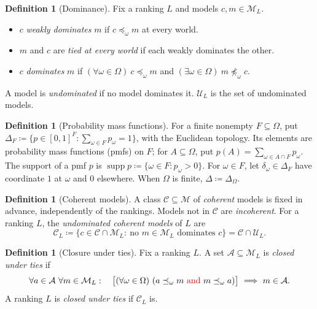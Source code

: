 \documentclass[11pt]{article}
\theoremstyle{definition}
\newtheorem{definition}[theorem]{Definition}
\theoremstyle{remark}
\newcommand{\M}{\mathcal M}
\newcommand{\C}{\mathcal C}
\newcommand{\U}{\mathcal U}
\newcommand{\supp}{\operatorname{supp}}
\begin{document}
\begin{definition}[Dominance]\label{def:dominance}
Fix a ranking $L$ and models $c,m\in\M_L$.
\begin{itemize}[leftmargin=*]
\item $c$ \emph{weakly dominates} $m$ if $c\preceq_\omega m$ at every world.
\item $m$ and $c$ are \emph{tied at every world} if each weakly dominates the other.
\item $c$ \emph{dominates} $m$ if $(\forall\omega\in\Omega)\ c\preceq_\omega m$ and $(\exists\omega\in\Omega)\ m\not\preceq_\omega c$.
\end{itemize}
A model is \emph{undominated} if no model dominates it. $\U_L$ is the set of undominated models.
\end{definition}

\begin{definition}[Probability mass functions]\label{def:priors}
For a finite nonempty $F\subseteq\Omega$, put $\Delta_F\coloneqq\{p\in[0,1]^F:\sum_{\omega\in F}p_\omega=1\}$, with the Euclidean topology. Its elements are probability mass functions (pmfs) on $F$; for $A\subseteq\Omega$, put $p(A)=\sum_{\omega\in A\cap F}p_\omega$. The support of a pmf $p$ is $\supp p\coloneqq\{\omega\in F:p_\omega>0\}$. For $\omega\in F$, let $\delta_\omega\in\Delta_F$ have coordinate $1$ at $\omega$ and $0$ elsewhere. When $\Omega$ is finite, $\Delta\coloneqq\Delta_\Omega$.
\end{definition}

\begin{definition}[Coherent models]\label{def:coherence-property}
A class $\C\subseteq\M$ of \emph{coherent} models is fixed in advance, independently of the rankings. Models not in $\C$ are \emph{incoherent}. For a ranking $L$, the \emph{undominated coherent models} of $L$ are
\[
\C_L\coloneqq\{c\in\C\cap\M_L:\ \text{no } m\in\M_L \text{ dominates } c\}=\C\cap\U_L.
\]
\end{definition}

\begin{definition}[Closure under ties]\label{def:tie-closure}
Fix a ranking $L$. A set $\mathcal A\subseteq\M_L$ is \emph{closed under ties} if
\[
\forall a\in\mathcal A\ \forall m\in\M_L:\quad
\bigl[(\forall\omega\in\Omega)\ (a\preceq_\omega m\ \textcolor{red}{\text{and}}\ m\preceq_\omega a)\bigr]\ \Longrightarrow\ m\in\mathcal A.
\] A ranking $L$ is \emph{closed under ties} if $\C_L$ is.
\end{definition}
\end{document}
